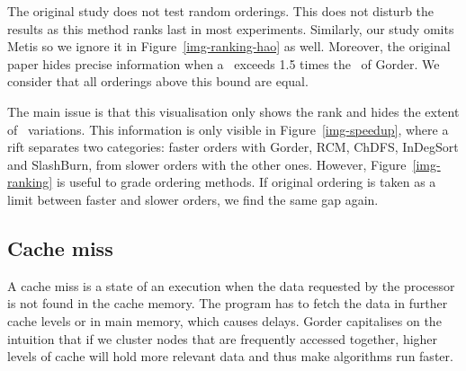 The original study does not test random orderings. This does not disturb the results as this method ranks last in most experiments. Similarly, our study omits Metis so we ignore it in Figure~\ref{img-ranking-hao} as well.
%
Moreover, the original paper hides precise information when a \runtime\ exceeds 1.5 times the \runtime\ of Gorder. We consider that all orderings above this bound are equal.

The main issue is that this visualisation only shows the rank and hides the extent of \runtime\ variations. This information is only visible in Figure~\ref{img-speedup}, where a rift separates two categories: faster orders with Gorder, RCM, ChDFS, InDegSort and SlashBurn, from slower orders with the other ones. However, Figure~\ref{img-ranking} is useful to grade ordering methods. If original ordering is taken as a limit between faster and slower orders, we find the same gap again.

\subsection{Cache miss}

A cache miss is a state of an execution when the data requested by the processor is not found in the cache memory. The program has to fetch the data in further cache levels or in main memory, which causes delays.
%
Gorder capitalises on the intuition that if we cluster nodes that are frequently accessed together, higher levels of cache will hold more relevant data and thus make algorithms run faster.



